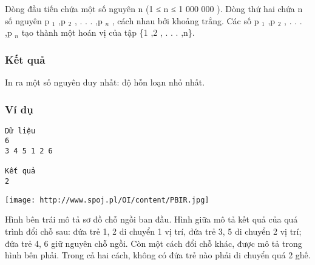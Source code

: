    Dòng đầu tiến chứa một số nguyên n (1 ≤ n ≤ 1 000 000 ). Dòng thứ hai chứa n số nguyên p   $_    1   $   ,p   $_    2   $   , . . . ,p   $_    n   $   , cách nhau bởi khoảng trắng. Các số p   $_    1   $   ,p   $_    2   $   , . . . ,p   $_    n   $   tạo thành một hoán vị của tập \{1 ,2 , . . . ,n\}.  

\subsubsection{   Kết quả  }

   In ra một số nguyên duy nhất: độ hỗn loạn nhỏ nhất.  

\subsubsection{   Ví dụ  }
\begin{verbatim}
Dữ liệu
6
3 4 5 1 2 6

Kết quả
2
\end{verbatim}
\texttt{[image: http://www.spoj.pl/OI/content/PBIR.jpg]}

   Hình bên trái mô tả sơ đồ chỗ ngồi ban đầu. Hình giữa mô tả kết quả của quá trình đổi chỗ sau: đứa trẻ 1, 2 di chuyển 1 vị trí, đứa trẻ 3, 5 di chuyển 2 vị trí; đứa trẻ 4, 6 giữ nguyên chỗ ngồi. Còn một cách đổi chỗ khác, được mô tả trong hình bên phải. Trong cả hai cách, không có đứa trẻ nào phải di chuyển quá 2 ghế.  